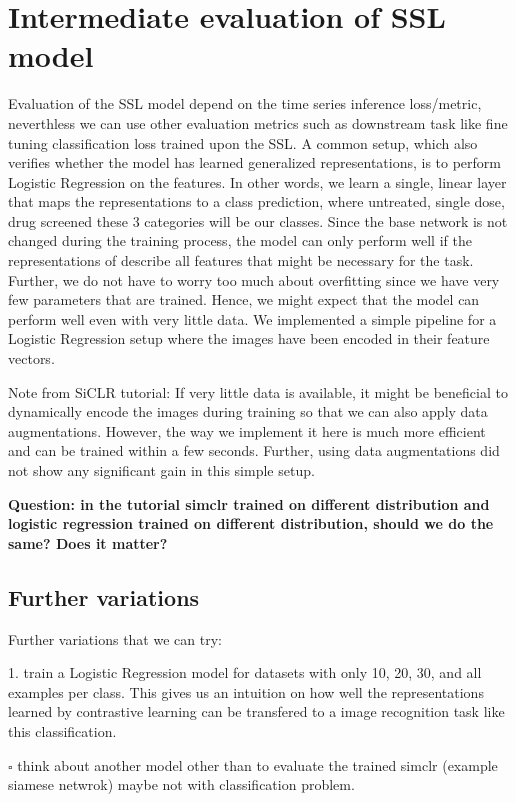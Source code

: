\documentclass[12pt,twoside,a4paper,parskip]{scrbook} %
\begin{document}
\section{Intermediate evaluation of SSL model}
Evaluation of the SSL model depend on the  time series inference loss/metric, neverthless we can use other evaluation metrics such as downstream task like fine tuning classification loss trained upon the SSL. A common setup, which also verifies whether the model has learned generalized representations, is to perform Logistic Regression on the features. In other words, we learn a single, linear layer that maps the representations to a class prediction, where untreated, single dose, drug screened these 3 categories will be our classes. Since the base network is not changed during the training process, the model can only perform well if the representations of describe all features that might be necessary for the task. Further, we do not have to worry too much about overfitting since we have very few parameters that are trained. Hence, we might expect that the model can perform well even with very little data. We implemented a  simple pipeline for a  Logistic Regression setup where the images have been encoded in their feature vectors. 

Note from SiCLR tutorial: If very little data is available, it might be beneficial to dynamically encode the images during training so that we can also apply data augmentations. However, the way we implement it here is much more efficient and can be trained within a few seconds. Further, using data augmentations did not show any significant gain in this simple setup.

\textbf{Question: in the tutorial simclr trained on different distribution and logistic regression trained on different distribution, should we do the same? Does it matter?} 


\subsection{Further variations}
Further variations that we can try: 

1. train a Logistic Regression model for datasets with only 10, 20, 30, and all  examples per class. This gives us an intuition on how well the representations learned by contrastive learning can be transfered to a image recognition task like this classification.

$\square$ think about another model other than to evaluate the trained simclr (example siamese netwrok) maybe not with classification problem.
\end{document}
